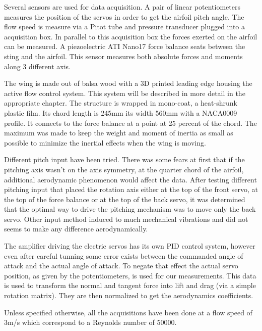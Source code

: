 \par Several sensors are used for data acquisition.
A pair of linear potentiometers measures the position of the servos in order to get the airfoil pitch angle.
The flow speed is measure via a Pitot tube and pressure transducer plugged into a acquisition box.
In parallel to this acquisition box the forces exerted on the airfoil can be measured.
A piezoelectric ATI Nano17 force balance seats between the sting and the airfoil.
This sensor measures both absolute forces and moments along 3 different axis.

\par The wing is made out of balsa wood with a 3D printed leading edge housing the active flow control system.
This system will be described in more detail in the appropriate chapter.
The structure is wrapped in mono-coat, a heat-shrunk plastic film.
Its chord length is 245mm its width 560mm with a NACA0009 profile.
It connects to the force balance at a point at 25 percent of the chord.
The maximum was made to keep the weight and moment of inertia as small as possible to minimize the inertial effects when the wing is moving.

Different pitch input have been tried.
There was some fears at first that if the pitching axis wasn't on the axis symmetry, at the quarter chord of the airfoil, additional aerodynamic phenomenon would affect the data.
After testing different pitching input that placed the rotation axis either at the top of the front servo, at the top of the force balance or at the top of the back servo,  it was determined that the optimal way to drive the pitching mechanism was to move only the back servo.
Other input method induced to much mechanical vibrations and did not seems to make any difference aerodynamically.

\par The amplifier driving the electric servos has its own PID control system, however even after careful tunning some error exists between the commanded angle of attack and the actual angle of attack.
To negate that effect the actual servo position, as given by the potentiometers, is used for our measurements.
This data is used to transform the normal and tangent force into lift and drag (via a simple rotation matrix). 
They are then normalized to get the aerodynamics coefficients.

\par Unless specified otherwise, all the acquisitions have been done at a flow speed of 3m/s which correspond to a Reynolds number of 50000.

